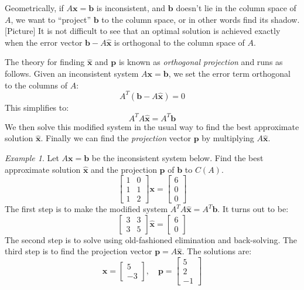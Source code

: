 \documentclass[11pt,oneside]{amsbook}
\theoremstyle{definition}
\theoremstyle{plain}
\theoremstyle{definition}
\theoremstyle{remark}
\newtheorem{example}[theorem]{Example}
\numberwithin{equation}{section}
\numberwithin{figure}{section}
\begin{document}
Geometrically, if $A\mathbf{x}=\mathbf{b}$ is inconsistent, and $\mathbf{b}$ doesn't lie in the column space of $A$, we want to ``project'' $\mathbf{b}$ to the column space, or in other words find its shadow. [Picture] It is not difficult to see that an optimal solution is achieved exactly when the error vector $\mathbf{b}-A\hat{\mathbf{x}}$ is orthogonal to the column space of $A$.

The theory for finding $\hat{\mathbf{x}}$ and $\mathbf{p}$ is known as \emph{orthogonal projection} and runs as follows. Given an inconsistent system $A\mathbf{x}=\mathbf{b}$, we set the error term orthogonal to the columns of $A$:
\[A^T(\mathbf{b}-A\hat{\mathbf{x}})=0
\]
This simplifies to:
\[A^TA\hat{\mathbf{x}}=A^T\mathbf{b}
\]
We then solve this modified system in the usual way to find the best approximate solution $\hat{\mathbf{x}}$. Finally we can find the \emph{projection} vector $\mathbf{p}$ by multiplying $A\hat{\mathbf{x}}$.

\begin{example}
  Let $A\mathbf{x}=\mathbf{b}$ be the inconsistent system below. Find the best approximate solution $\hat{\mathbf{x}}$ and the projection $\mathbf{p}$ of $\mathbf{b}$ to $C(A)$.
  \[\begin{bmatrix}1&0\\1&1\\1&2\end{bmatrix}\mathbf{x}
    =\begin{bmatrix}6\\0\\0\end{bmatrix}
  \]
  The first step is to make the modified system $A^TA\hat{\mathbf{x}}=A^T\mathbf{b}$. It turns out to be:
  \[\begin{bmatrix}3&3\\3&5\end{bmatrix}\hat{\mathbf{x}}
  =\begin{bmatrix}6\\0\end{bmatrix}
  \]
  The second step is to solve using old-fashioned elimination and back-solving. The third step is to find the projection vector $\mathbf{p}=A\hat{\mathbf{x}}$. The solutions are:
  \[\hat{\mathbf{x}}=\begin{bmatrix}5\\-3\end{bmatrix},\quad 
  \mathbf{p}=\begin{bmatrix}5\\2\\-1\end{bmatrix}
  \]
\end{example}
\end{document}
